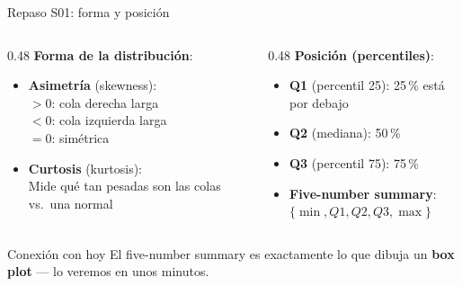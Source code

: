\documentclass[aspectratio=169, 11pt]{beamer}
\begin{document}
\begin{frame}{Repaso S01: forma y posición}
\begin{columns}[T]
\begin{column}{0.48\textwidth}
\textbf{Forma de la distribuci\'on}:
\begin{itemize}\setlength{\itemsep}{2pt}
\item \textbf{Asimetr\'ia} (skewness):\\
  $> 0$: cola derecha larga\\
  $< 0$: cola izquierda larga\\
  $= 0$: sim\'etrica
\item \textbf{Curtosis} (kurtosis):\\
  Mide qu\'e tan pesadas son las colas vs.\ una normal
\end{itemize}
\end{column}
\begin{column}{0.48\textwidth}
\textbf{Posici\'on (percentiles)}:
\begin{itemize}\setlength{\itemsep}{2pt}
\item \textbf{Q1} (percentil 25): 25\,\% est\'a por debajo
\item \textbf{Q2} (mediana): 50\,\%
\item \textbf{Q3} (percentil 75): 75\,\%
\item \textbf{Five-number summary}:\\
  $\{\min, Q1, Q2, Q3, \max\}$
\end{itemize}
\end{column}
\end{columns}

\vspace{0.5em}
\begin{exampleblock}{Conexión con hoy}
El five-number summary es exactamente lo que dibuja un \textbf{box plot} --- lo veremos en unos minutos.
\end{exampleblock}
\end{frame}
\end{document}
